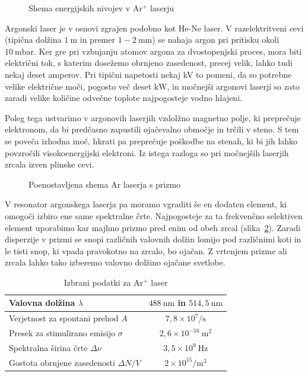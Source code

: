 \begin{figure}[h]
\centering
\def\svgwidth{80truemm} 

\caption{Shema energijskih nivojev v Ar$^+$ laserju}
\label{fig:ArE}
\end{figure}

Argonski laser je v osnovi zgrajen podobno kot He-Ne laser. V razelektritveni cevi
(tipična dolžina $1~\si{\metre}$ in premer $1-2~\si{\milli\metre}$)
se nahaja argon pri pritisku okoli $10~\si{\milli\bar}$. Ker gre pri 
vzbujanju atomov argona za dvostopenjski proces, mora biti električni tok, 
s katerim dosežemo obrnjeno zasedenost, precej velik, lahko tudi nekaj deset amperov. 
Pri tipični napetosti nekaj kV to pomeni, da so potrebne velike električne moči, 
pogosto več deset $\si{\kilo\watt}$, in močnejši argonovi laserji so zato zaradi 
velike količine odvečne toplote najpogosteje vodno hlajeni.

Poleg tega ustvarimo v argonovih laserjih vzdolžno magnetno polje, ki preprečuje 
elektronom, da bi predčasno zapustili ojačevalno območje in trčili v steno. S
tem se poveča izhodna moč, hkrati pa preprečuje poškodbe na stenah, ki bi jih 
lahko povzročili visokoenergijski elektroni. Iz istega razloga so pri močnejših
laserjih zrcala izven plinske cevi. 

\begin{figure}[h]
\centering
\def\svgwidth{90truemm} 

\caption{Poenostavljena shema Ar laserja s prizmo}
\label{fig:ArS}
\end{figure}

V resonator argonskega laserja pa moramo vgraditi še en dodaten element, ki omogoči
izbiro ene same spektralne črte. Najpogosteje za ta frekvenčno selektiven element
uporabimo kar majhno prizmo pred enim od obeh zrcal (slika~\ref{fig:ArS}). Zaradi disperzije
v prizmi se snopi različnih valovnih dolžin lomijo pod različnimi koti in le tisti 
snop, ki vpada pravokotno na zrcalo, bo ojačan. Z vrtenjem prizme ali zrcala lahko 
tako izberemo valovno dolžino ojačane svetlobe.

\begin{table}
\begin{center}
\begin{tabular}{|l|c|}\hline
Valovna dolžina $\lambda$ & $488~\si{\nano\metre}$ in $514,5~\si{\nano\metre}$\\ \hline
Verjetnost za spontani prehod $A$ & $7,8 \times 10^7/\si{\second}$  \\ \hline
Presek za stimulirano emisijo $\sigma$ & $2,6 \times 10^{-16}~\si{\metre}^2$  \\ \hline
Spektralna širina črte $\Delta \nu$ & $3,5 \times 10^{9}~\si{\hertz}$  \\ \hline
Gostota obrnjene zasedenosti $\Delta N/V$ & $2 \times 10^{15}/\si{\metre}^3$ \\ \hline
\end{tabular}
\caption{Izbrani podatki za Ar$^+$ laser}
\label{tab:Ar}
\end{center}
\end{table}

